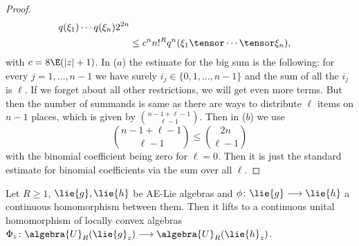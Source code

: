 \begin{proof}
\begin{align*}
        q(\xi_1) \cdots q(\xi_n)
        2^{2n}
        \\
        &\leq
        c^n n!^R q^n(\xi_1 \tensor \cdots \tensor \xi_n),
    \end{align*}
    with $c = 8 \E (|z| + 1)$. In ($a$) the estimate for the big sum
    is the following: for every $j = 1, \ldots, n-1$ we have surely
    $i_j \in \{0, 1, \ldots, n-1\}$ and the sum of all the $i_j$ is
    $\ell$. If we forget about all other restrictions, we will get
    even more terms. But then the number of summands is same as there
    are ways to distribute $\ell$ items on $n-1$ places, which is
    given by $\binom{n - 1 + \ell - 1}{\ell - 1}$. Then in ($b$) we
    use
    \begin{equation*}
        \binom{n - 1 + \ell - 1}{\ell - 1} \leq \binom{2 n}{\ell - 1}
    \end{equation*}
    with the binomial coefficient being zero for $\ell = 0$. Then it
    is just the standard estimate for binomial coefficients via the
    sum over all $\ell$.
\end{proof}
\begin{proposition}[Functoriality]
	\label{LCAna:Prop:Functoriality}
	Let $R \geq 1$, $\lie{g}, \lie{h}$ be AE-Lie algebras and $\phi \colon
	\lie{g} \longrightarrow \lie{h}$ a continuous homomorphism between them.
	Then it lifts to a continuous unital homomorphism of locally convex
	algebras $\Phi_z \colon \algebra{U}_R(\lie{g}_z) \longrightarrow
	\algebra{U}_R(\lie{h}_z)$.
\end{proposition}
